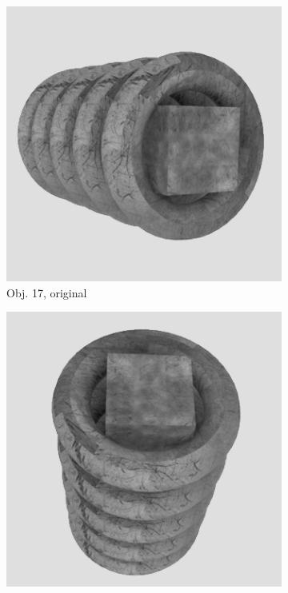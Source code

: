 \begin{figure}
\medskip
\begin{subfigure}{0.2\textwidth}
\includegraphics[width=\linewidth]{Bilder/Objekt17A.png}
\caption{Obj. 17, original} \label{fig:c}
\end{subfigure}\hspace{.5cm} %
\begin{subfigure}{0.2\textwidth}
\includegraphics[width=\linewidth]{Bilder/Objekt17B.png}

\end{subfigure}
\end{figure}
